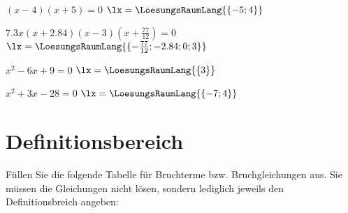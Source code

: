 \begin{bbwAufgabenBlock}

\item $(x-4)(x+5)=0$  \hspace{10mm}  $\lx = \LoesungsRaumLang{\{-5; 4\}}$

\item $7.3x(x+2.84)(x-3)(x+\frac{77}{12}) = 0$  \hspace{10mm}  $\lx = \LoesungsRaumLang{\{-\frac{77}{12};-2.84;0;3\}}$

\item $x^2 -6x + 9 = 0$  \hspace{10mm}  $\lx = \LoesungsRaumLang{\{3\}}$

\item $x^2 +3x - 28= 0$  \hspace{10mm}  $\lx = \LoesungsRaumLang{\{-7; 4\}}$

\end{bbwAufgabenBlock}

\newpage


\section{Definitionsbereich}

Füllen Sie die folgende Tabelle für Bruchterme bzw. Bruchgleichungen
aus. Sie müssen die Gleichungen nicht lösen, sondern lediglich jeweils
den Definitionsbreich angeben:

